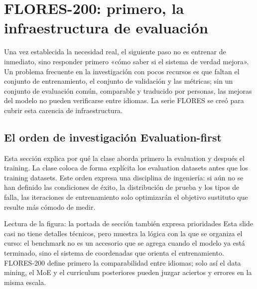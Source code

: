\section{FLORES-200: primero, la infraestructura de evaluación}

Una vez establecida la necesidad real, el siguiente paso no es entrenar de inmediato, sino responder primero «cómo saber si el sistema de verdad mejora». Un problema frecuente en la investigación con pocos recursos es que faltan el conjunto de entrenamiento, el conjunto de validación y las métricas; sin un conjunto de evaluación común, comparable y traducido por personas, las mejoras del modelo no pueden verificarse entre idiomas. La serie FLORES se creó para cubrir esta carencia de infraestructura.

\subsection{El orden de investigación Evaluation-first}

Esta sección explica por qué la clase aborda primero la evaluation y después el training. La clase coloca de forma explícita los evaluation datasets antes que los training datasets. Este orden expresa una disciplina de ingeniería: si aún no se han definido las condiciones de éxito, la distribución de prueba y los tipos de falla, las iteraciones de entrenamiento solo optimizarán el objetivo sustituto que resulte más cómodo de medir.


\begin{knowledgebox}{Lectura de la figura: la portada de sección también expresa prioridades}
Esta slide casi no tiene detalles técnicos, pero muestra la lógica con la que se organiza el curso: el benchmark no es un accesorio que se agrega cuando el modelo ya está terminado, sino el sistema de coordenadas que orienta el entrenamiento. FLORES-200 define primero la comparabilidad entre idiomas; solo así el data mining, el MoE y el curriculum posteriores pueden juzgar aciertos y errores en la misma escala.
\end{knowledgebox}


